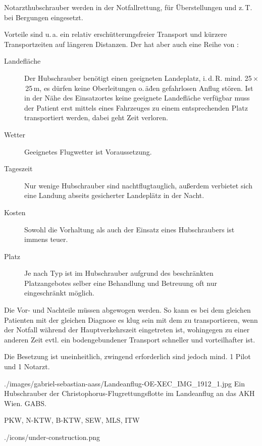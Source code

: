 {%
Notarzthubschrauber werden in der Notfallrettung, für Überstellungen und z.\,T.
bei Bergungen eingesetzt.

Vorteile sind u.\,a. ein relativ erschütterungsfreier Transport und kürzere
Transportzeiten auf längeren Distanzen. Der  hat aber auch eine Reihe
von :

\begin{description}
  \item[Landefläche] Der Hubschrauber benötigt einen geeigneten Landeplatz,
  i.\,d.\,R. mind. 25\,$\times$\,25\,m, es dürfen keine Oberleitungen o.\,ä\.
  den gefahrlosen Anflug stören. Ist in der Nähe des Einsatzortes keine
  geeignete Landefläche verfügbar muss der Patient erst mittels eines Fahrzeuges
  zu einem entsprechenden Platz transportiert werden, dabei geht Zeit verloren. 
  \item[Wetter] Geeignetes Flugwetter ist Voraussetzung.
  \item[Tageszeit] Nur wenige Hubschrauber sind nachtflugtauglich, außerdem
  verbietet sich eine Landung abseits gesicherter Landeplätz in der Nacht. 
  \item[Kosten] Sowohl die Vorhaltung als auch der Einsatz eines Hubschraubers
  ist immens teuer.
  \item[Platz] Je nach Typ ist im Hubschrauber aufgrund des beschränkten Platzangebotes selber
eine Behandlung und Betreuung oft nur eingeschränkt möglich. 
\end{description}

Die Vor- und Nachteile müssen abgewogen werden. So kann es bei dem gleichen
Patienten mit der gleichen Diagnose es klug sein mit dem  zu
transportieren, wenn der Notfall während der Hauptverkehrszeit eingetreten ist,
wohingegen zu einer anderen Zeit evtl. ein bodengebundener Transport schneller
und vorteilhafter ist.



Die Besetzung ist uneinheitlich, zwingend erforderlich sind jedoch mind. 1 Pilot
und 1 Notarzt.

{\TakeNotesLarge}
}{

}
{./images/gabriel-sebastian-aass/Landeanflug-OE-XEC_IMG_1912_1.jpg}
{Ein Hubschrauber der Christophorus-Flugrettungsflotte im Landeanflug an das AKH
Wien.} {GABS.}


{
PKW, N-KTW, B-KTW, SEW, MLS, ITW

{\TakeNotesLarge}
}{

}
{./icons/under-construction.png}
{}
{}

